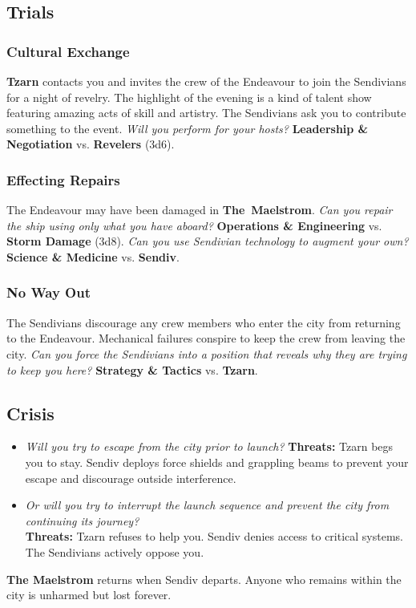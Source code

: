 \documentclass[11pt, a5paper, parskip=half-, DIV=12]{scrartcl}
\begin{document}
\subsection*{Trials}
\subsubsection*{Cultural Exchange}
\textbf{Tzarn} contacts you and invites the crew of the Endeavour to join the Sendivians for a night of revelry. The highlight of the evening is a kind of talent show featuring amazing acts of skill and artistry. The Sendivians ask you to contribute something to the event. \textit{Will you perform for your hosts?}
\textbf{Leadership \& Negotiation} vs. \textbf{Revelers} (3d6).

\subsubsection*{Effecting Repairs}
The Endeavour may have been damaged in \textbf{The~Maelstrom}. \textit{Can you repair the ship using only what you have aboard?}
\textbf{Operations \& Engineering} vs. \textbf{Storm Damage} (3d8). \textit{Can you use Sendivian technology to augment your own?} \textbf{Science \& Medicine} vs. \textbf{Sendiv}.

\subsubsection*{No Way Out}
The Sendivians discourage any crew members who enter the city from returning to the Endeavour.  Mechanical failures conspire to keep the crew from leaving the city. \textit{Can you force the Sendivians into a position that reveals why they are trying to keep you here?}
\textbf{Strategy \& Tactics} vs. \textbf{Tzarn}.


\subsection*{Crisis}
\begin{itemize}
	\item \textit{Will you try to escape from the city prior to launch?} \textbf{Threats:} Tzarn begs you to stay. Sendiv deploys force shields and grappling beams to prevent your escape and discourage outside interference.
	\item \textit{Or will you try to interrupt the launch sequence and prevent the city from continuing its journey?} \\ \textbf{Threats:} Tzarn refuses to help you. Sendiv denies access to critical systems. The Sendivians actively oppose you.
\end{itemize}
\textbf{The Maelstrom} returns when Sendiv departs. Anyone who remains within the city is unharmed but lost forever.
\end{document}
